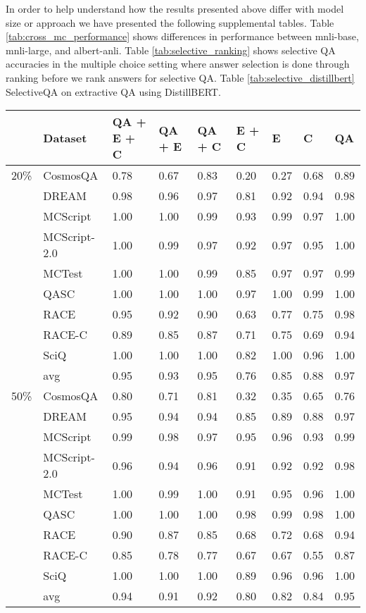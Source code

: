 \documentclass[11pt]{article}
\begin{document}
In order to help understand how the results presented above differ with model size or approach we have presented the following supplemental tables. Table \ref{tab:cross_mc_performance} shows differences in performance between mnli-base, mnli-large, and albert-anli. Table 
\ref{tab:selective_ranking} shows selective QA accuracies in the multiple choice setting where answer selection is done through ranking before we rank answers for selective QA. Table \ref{tab:selective_distillbert} SelectiveQA on extractive QA using DistillBERT.

\begin{table*}[]
\centering
\begin{tabular}{lllllllll}
\hline
 & Dataset & QA + E + C & QA + E & QA + C & E + C & E & C & QA \\ \hline
20\% & CosmosQA & 0.78 & 0.67 & 0.83 & 0.20 & 0.27 & 0.68 & 0.89 \\
 & DREAM & 0.98 & 0.96 & 0.97 & 0.81 & 0.92 & 0.94 & 0.98 \\
 & MCScript & 1.00 & 1.00 & 0.99 & 0.93 & 0.99 & 0.97 & 1.00 \\
 & MCScript-2.0 & 1.00 & 0.99 & 0.97 & 0.92 & 0.97 & 0.95 & 1.00 \\
 & MCTest & 1.00 & 1.00 & 0.99 & 0.85 & 0.97 & 0.97 & 0.99 \\
 & QASC & 1.00 & 1.00 & 1.00 & 0.97 & 1.00 & 0.99 & 1.00 \\
 & RACE & 0.95 & 0.92 & 0.90 & 0.63 & 0.77 & 0.75 & 0.98 \\
 & RACE-C & 0.89 & 0.85 & 0.87 & 0.71 & 0.75 & 0.69 & 0.94 \\
 & SciQ & 1.00 & 1.00 & 1.00 & 0.82 & 1.00 & 0.96 & 1.00 \\
 & avg & 0.95 & 0.93 & 0.95 & 0.76 & 0.85 & 0.88 & 0.97 \\
50\% & CosmosQA & 0.80 & 0.71 & 0.81 & 0.32 & 0.35 & 0.65 & 0.76 \\
 & DREAM & 0.95 & 0.94 & 0.94 & 0.85 & 0.89 & 0.88 & 0.97 \\
 & MCScript & 0.99 & 0.98 & 0.97 & 0.95 & 0.96 & 0.93 & 0.99 \\
 & MCScript-2.0 & 0.96 & 0.94 & 0.96 & 0.91 & 0.92 & 0.92 & 0.98 \\
 & MCTest & 1.00 & 0.99 & 1.00 & 0.91 & 0.95 & 0.96 & 1.00 \\
 & QASC & 1.00 & 1.00 & 1.00 & 0.98 & 0.99 & 0.98 & 1.00 \\
 & RACE & 0.90 & 0.87 & 0.85 & 0.68 & 0.72 & 0.68 & 0.94 \\
 & RACE-C & 0.85 & 0.78 & 0.77 & 0.67 & 0.67 & 0.55 & 0.87 \\
 & SciQ & 1.00 & 1.00 & 1.00 & 0.89 & 0.96 & 0.96 & 1.00 \\
 & avg & 0.94 & 0.91 & 0.92 & 0.80 & 0.82 & 0.84 & 0.95 \\ \hline
\end{tabular}
\caption{Selective QA accuracies in the multiple choice setting where answer selection is done through ranking before we rank answers for selective QA.}
\label{tab:selective_ranking}
\end{table*}
\end{document}
